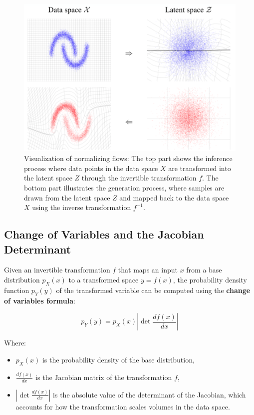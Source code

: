 \documentclass{article}
\begin{document}
\begin{figure}[ht]
    \centering
    \includegraphics[width=0.75\linewidth]{graphics/S9Flows/space_transformations.png}
    \caption{Visualization of normalizing flows: The top part shows the inference process where data points in the data space \(X\) are transformed into the latent space \(Z\) through the invertible transformation \(f\). The bottom part illustrates the generation process, where samples are drawn from the latent space \(Z\) and mapped back to the data space \(X\) using the inverse transformation \(f^{-1}\).}
    \label{fig:space-transformations}
\end{figure}

\subsection{Change of Variables and the Jacobian Determinant}
Given an invertible transformation \( f \) that maps an input \( x \) from a base distribution \( p_X(x) \) to a transformed space \( y = f(x) \), the probability density function \( p_Y(y) \) of the transformed variable can be computed using the \textbf{change of variables formula}:

\[
p_Y(y) = p_X(x) \left| \det \frac{d f(x)}{dx} \right|
\]

Where:
\begin{itemize}
    \item \( p_X(x) \) is the probability density of the base distribution,
    \item \( \frac{d f(x)}{dx} \) is the Jacobian matrix of the transformation \( f \),
    \item \( \left| \det \frac{d f(x)}{dx} \right| \) is the absolute value of the determinant of the Jacobian, which accounts for how the transformation scales volumes in the data space.
\end{itemize}
\end{document}
